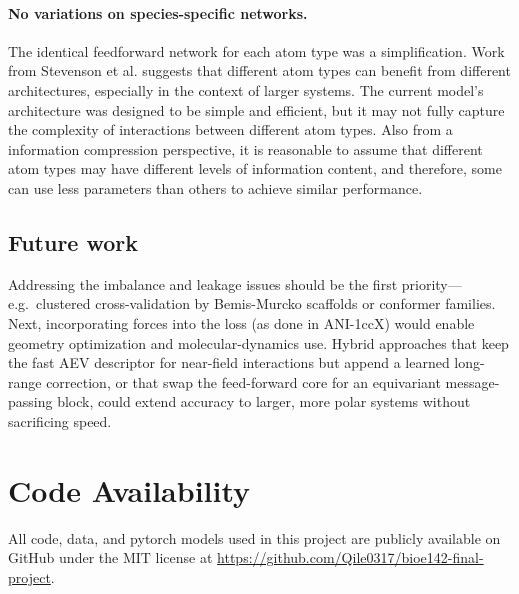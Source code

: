 \documentclass[11pt, twocolumn]{article}
\begin{document}
\paragraph{No variations on species-specific networks.} The identical feedforward network for each atom type was a simplification. Work from Stevenson et al. \cite{stevenson2019schr} suggests that different atom types can benefit from different architectures, especially in the context of larger systems. The current model's architecture was designed to be simple and efficient, but it may not fully capture the complexity of interactions between different atom types. Also from a information compression perspective, it is reasonable to assume that different atom types may have different levels of information content, and therefore, some can use less parameters than others to achieve similar performance.

\subsection{Future work}

Addressing the imbalance and leakage issues should be the first priority—e.g.\ clustered cross-validation by Bemis-Murcko scaffolds or conformer families.
Next, incorporating forces into the loss (as done in ANI-1ccX) would enable geometry optimization and molecular-dynamics use. Hybrid approaches that keep the fast AEV descriptor for near-field interactions but append a learned long-range correction, or that swap the feed-forward core for an equivariant message-passing block, could extend accuracy to larger, more polar systems without sacrificing speed.

\section{Code Availability}

All code, data, and pytorch models used in this project are publicly available on GitHub under the MIT license at \url{https://github.com/Qile0317/bioe142-final-project}.

\printbibliography[heading=bibnumbered]
\end{document}
